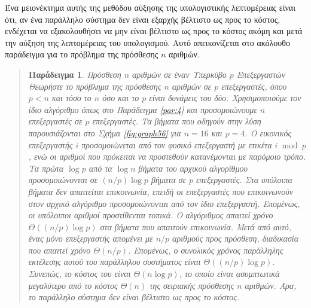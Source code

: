 \documentclass[12pt,a4paper]{article} %
\newtheorem{paradeigma}{Παράδειγμα}
\begin{document}
Ένα μειονέκτημα αυτής της μεθόδου αύξησης της υπολογιστικής λεπτομέρειας 
είναι ότι, αν ένα παράλληλο σύστημα δεν είναι εξαρχής βέλτιστο ως προς το 
κόστος, ενδέχεται να εξακολουθήσει να μην είναι βέλτιστο ως προς το κόστος 
ακόμη και μετά την αύξηση της λεπτομέρειας του υπολογισμού. Αυτό απεικονίζεται 
στο ακόλουθο παράδειγμα για το πρόβλημα της πρόσθεσης $n$ αριθμών.

\begin{quote}
\begin{paradeigma} \label{par:7} Πρόσθεση $n$ αριθμών σε έναν Υπερκύβο $p$ Επεξεργαστών
Θεωρήστε το πρόβλημα της πρόσθεσης $n$ αριθμών σε $p$ επεξεργαστές, όπου 
$p < n$ και τόσο το $n$ όσο και το $p$ είναι δυνάμεις του δύο. Χρησιμοποιούμε 
τον ίδιο αλγόριθμο όπως στο Παράδειγμα \ref{par:4} και προσομοιώνουμε $n$ 
επεξεργαστές σε $p$ επεξεργαστές. Τα βήματα που οδηγούν στην λύση παρουσιάζονται 
στο Σχήμα \ref{fig:graph56} για $n=16$ και $p=4$. Ο εικονικός επεξεργαστής 
$i$ προσομοιώνεται από τον φυσικό επεξεργαστή με ετικέτα $i \bmod p$, ενώ 
οι αριθμοί που πρόκειται να προστεθούν κατανέμονται με παρόμοιο τρόπο. Τα 
πρώτα $\log p$ από τα $\log n$ βήματα του αρχικού αλγορίθμου προσομοιώνονται 
σε $(n/p)\log p$ βήματα σε $p$ επεξεργαστές. Στα υπόλοιπα βήματα δεν 
απαιτείται επικοινωνία, επειδή οι επεξεργαστές που επικοινωνούν στον αρχικό 
αλγόριθμο προσομοιώνονται από τον ίδιο επεξεργαστή. Επομένως, οι υπόλοιποι 
αριθμοί προστίθενται τοπικά. Ο αλγόριθμος απαιτεί χρόνο $\Theta((n/p)\log p)$ 
στα βήματα που απαιτούν επικοινωνία. Μετά από αυτό, ένας μόνο επεξεργαστής 
απομένει με $n/p$ αριθμούς προς πρόσθεση, διαδικασία που απαιτεί χρόνο 
$\Theta(n/p)$. Επομένως, ο συνολικός χρόνος παράλληλης εκτέλεσης αυτού του 
παράλληλου συστήματος είναι $\Theta((n/p)\log p)$. Συνεπώς, το κόστος του 
είναι $\Theta(n\log p)$, το οποίο είναι ασυμπτωτικά μεγαλύτερο από το κόστος 
$\Theta(n)$ της σειριακής πρόσθεσης $n$ αριθμών. Άρα, το παράλληλο σύστημα 
δεν είναι βέλτιστο ως προς το κόστος.
\end{paradeigma}
\end{quote}
\end{document}
